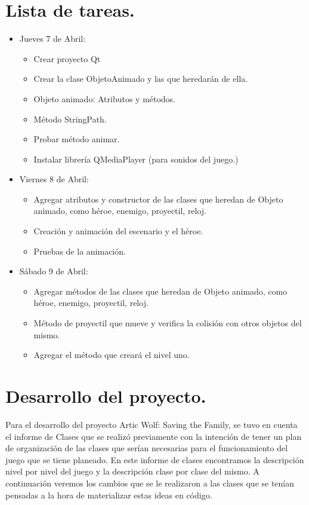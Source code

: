 \documentclass{article}
\begin{document}
\section{Lista de tareas.}
\begin{itemize}
    \item Jueves 7 de Abril:
    \begin{itemize}
        \item Crear proyecto Qt
        \item Crear la clase ObjetoAnimado y las que heredarán de ella.
        \item Objeto animado: Atributos y métodos.
        \item Método StringPath.
        \item Probar método animar.
        \item Instalar librería QMediaPlayer (para sonidos del juego.)
        
    \end{itemize}
    \item Viernes 8 de Abril:
    \begin{itemize}
        \item Agregar atributos y constructor de las clases que heredan de Objeto animado, como héroe, enemigo, proyectil, reloj.
        \item Creación y animación del escenario y el héroe.
        \item Pruebas de la animación.
    
    \end{itemize}
    
    \item Sábado 9 de Abril:
    \begin{itemize}
        \item Agregar métodos de las clases que heredan de Objeto animado, como héroe, enemigo, proyectil, reloj.
        \item Método de proyectil que mueve y verifica la colisión con otros objetos del mismo.
        \item Agregar el método que creará el nivel uno.
        
    
    \end{itemize}
\end{itemize}

\section{Desarrollo del proyecto.}
Para el desarrollo del proyecto Artic Wolf: Saving the Family, se tuvo en cuenta el informe de Clases que se realizó previamente con la intención de tener un plan de organización de las clases que serían necesarias para el funcionamiento del juego que se tiene planeado. En este informe de clases encontramos la descripción nivel por nivel del juego y la descripción clase por clase del mismo. A continuación veremos los cambios que se le realizaron a las clases que se tenían pensadas a la hora de materializar estas ideas en código.
\end{document}
